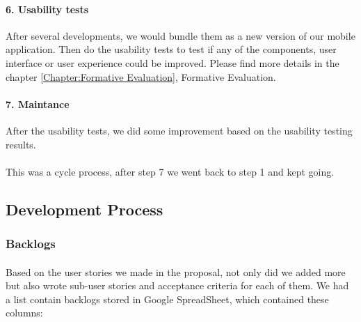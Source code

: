 \documentclass[12pt,a4paper]{article}
\begin{document}
          \paragraph{6. Usability tests}After several developments, we would bundle them as a new version of our mobile application. Then do the usability tests to test if any of the components, user interface or user experience could be improved. Please find more details in the chapter \ref{Chapter:Formative Evaluation}, Formative Evaluation.
          
          \paragraph{7. Maintance}After the usability tests, we did some improvement based on the usability testing results. 
          
          \paragraph{}This was a cycle process, after step 7 we went back to step 1 and kept going.

      \subsection{Development Process}
        \subsubsection{Backlogs}
          \label{section:Development Process - Backlogs}
          \paragraph{}Based on the user stories we made in the proposal, not only did we added more but also wrote sub-user stories and acceptance criteria for each of them. We had a list contain backlogs stored in Google SpreadSheet, which contained these columns: 
\end{document}
